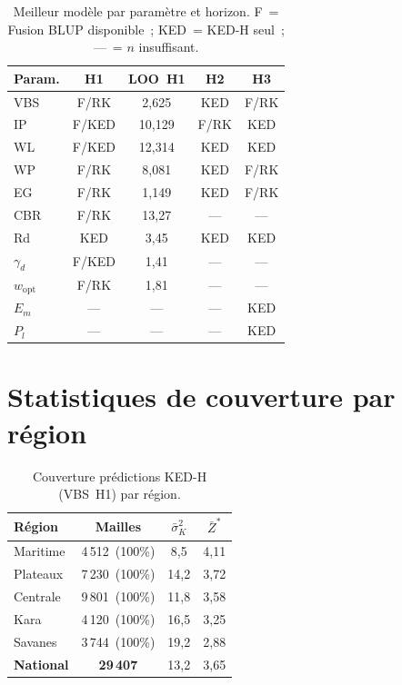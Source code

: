 \documentclass[10pt,a4paper,twocolumn]{article}
\begin{document}
	\begin{table}[H]
		\centering\small
		\caption{Meilleur modèle par paramètre et horizon.
			F~= Fusion BLUP disponible~;
			KED~= KED-H seul~;
			---~= $n$ insuffisant.}
		\label{tab:best_model_ext}
		\setlength{\tabcolsep}{3pt}
		\begin{tabular}{lcccc}
			\toprule
			Param. & H1 & LOO~H1 & H2 & H3 \\
			\midrule
			VBS  & F/RK  & 2,625  & KED & F/RK \\
			IP   & F/KED & 10,129 & F/RK & KED \\
			WL   & F/KED & 12,314 & KED & KED  \\
			WP   & F/RK  & 8,081  & KED & F/RK \\
			EG   & F/RK  & 1,149  & KED & F/RK \\
			CBR  & F/RK  & 13,27  & --- & ---  \\
			Rd   & KED   & 3,45   & KED & KED  \\
			$\gamma_d$ & F/KED & 1,41 & --- & --- \\
			$w_{\mathrm{opt}}$ & F/RK & 1,81 & --- & --- \\
			$E_m$ & ---  & ---    & --- & KED  \\
			$P_l$ & ---  & ---    & --- & KED  \\
			\bottomrule
		\end{tabular}
	\end{table}
	
	\section{Statistiques de couverture par région}
	\label{app:couverture}
	
	\begin{table}[H]
		\centering\small
		\caption{Couverture prédictions KED-H (VBS~H1) par région.}
		\label{tab:couverture_region}
		\begin{tabular}{lccc}
			\toprule
			Région & Mailles & $\bar{\sigma}^2_K$ & $\bar{Z}^*$ \\
			\midrule
			Maritime  & 4\,512~(100\%) & 8,5  & 4,11 \\
			Plateaux  & 7\,230~(100\%) & 14,2 & 3,72 \\
			Centrale  & 9\,801~(100\%) & 11,8 & 3,58 \\
			Kara      & 4\,120~(100\%) & 16,5 & 3,25 \\
			Savanes   & 3\,744~(100\%) & 19,2 & 2,88 \\
			\textbf{National} & \textbf{29\,407} & 13,2 & 3,65 \\
			\bottomrule
		\end{tabular}
	\end{table}
	
\end{document}
